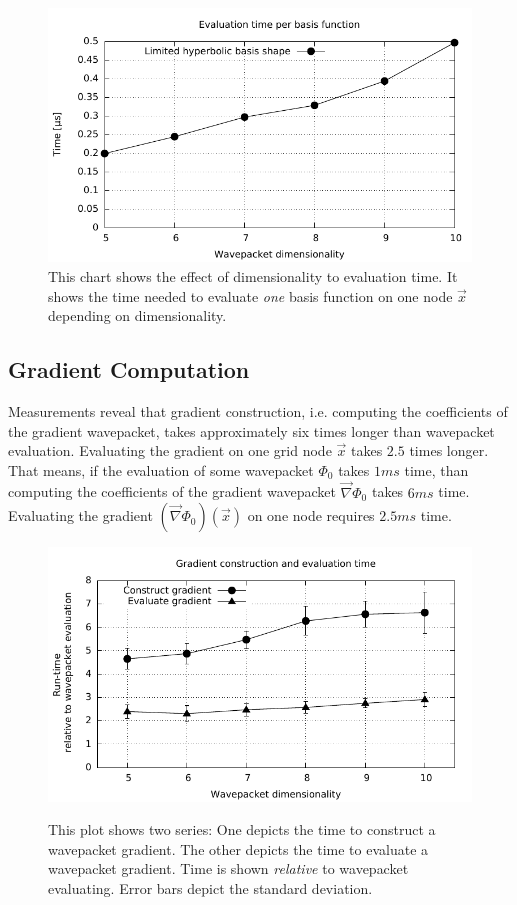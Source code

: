 \documentclass{article}
\begin{document}
\begin{figure}[H]
  \centering
  \includegraphics[width=1.0\textwidth]{plots/hawp_eval_efficiency}
  \caption{
    This chart shows the effect of dimensionality to evaluation time.
    It shows the time needed to evaluate \emph{one} basis function on one
    node \(\vec{x}\) depending on dimensionality.
  }
  \label{fig:hawp_eval_efficiency}
\end{figure}

\subsection{Gradient Computation}

Measurements reveal that gradient construction, i.e. computing the coefficients
of the gradient wavepacket, takes approximately six times longer than wavepacket evaluation.
Evaluating the gradient on one grid node \(\vec{x}\) takes \(2.5\) times longer.
That means, if the evaluation of some wavepacket \(\Phi_0\) takes \(1 ms\) time, than
computing the coefficients of the gradient wavepacket \(\vec{\nabla}\Phi_0\) takes \(6ms\) time.
Evaluating the gradient \((\vec{\nabla} \Phi_0)(\vec{x})\) on one node requires \(2.5 ms\) time.

\begin{figure}[H]
  \centering
  \includegraphics[width=1.0\textwidth]{plots/grad_reltime}
  \label{fig:grad_reltime}
  \caption{
    This plot shows two series: One depicts the time to construct a wavepacket gradient.
    The other depicts the time to evaluate a wavepacket gradient.
    Time is shown \emph{relative} to wavepacket evaluating.
    Error bars depict the standard deviation.
  }
\end{figure}
\end{document}
